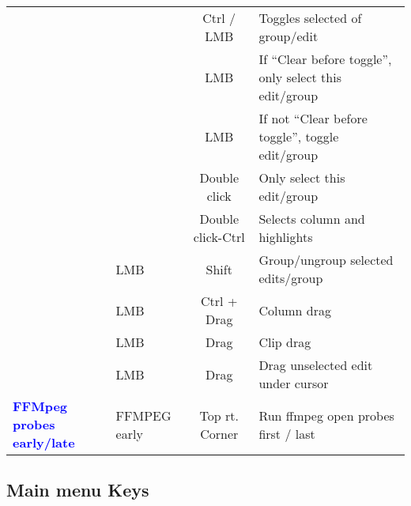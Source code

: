 \begin{center}
\begin{longtable}{ >{\bfseries}p{2cm} l c p{6cm}}
        &  & Ctrl / LMB & Toggles selected of group/edit \\        
        &  & LMB & If “Clear before toggle”, only select this edit/group \\        
        &  & LMB & If not “Clear before toggle”, toggle edit/group \\        
        &  & Double click & Only select this edit/group \\        
        &  & Double click-Ctrl & Selects column and highlights \\        
        & LMB & Shift & Group/ungroup selected edits/group \\        
        & LMB & Ctrl + Drag & Column drag \\        
        & LMB & Drag & Clip drag \\        
        & LMB & Drag & Drag unselected edit under cursor \\
        \midrule
        \textcolor{blue}{FFMpeg probes early/late} & FFMPEG early & Top rt. Corner & Run ffmpeg open probes first / last \\
        
        
        \bottomrule  
    \end{longtable}
\end{center}

\subsection{Main menu Keys}%
\label{sub:main_menu_keys}

